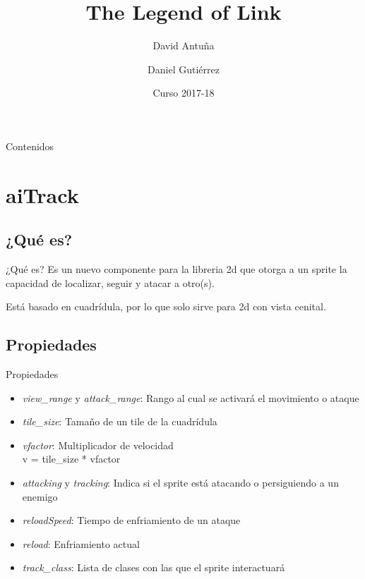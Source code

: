 \documentclass{beamer}
\title{The Legend of Link}
\author{David Antuña \and Daniel Gutiérrez}
\institute[UCM]
{
  DVI\\
  Universidad Complutense de Madrid
}
\date{Curso 2017-18}
\begin{document}
\begin{frame}
  \titlepage
\end{frame}

\begin{frame}{Contenidos}
  \tableofcontents
\end{frame}

\section{aiTrack}

\subsection{¿Qué es?}

\begin{frame}{¿Qué es?}
Es un nuevo componente para la libreria 2d que otorga a un sprite la capacidad
de localizar, seguir y atacar a otro(s).

\medskip

Está basado en cuadrídula, por lo que solo sirve para 2d con vista cenital.
\end{frame}

\subsection{Propiedades}

\begin{frame}{Propiedades}
\begin{itemize}
  \item \textit{view\_range} y \textit{attack\_range}: Rango al cual se activará
    el movimiento o ataque
  \item \textit{tile\_size}: Tamaño de un tile de la cuadrídula
  \item \textit{vfactor}: Multiplicador de velocidad\\
    v = tile\_size * vfactor
  \item \textit{attacking} y \textit{tracking}: Indica si el sprite está
    atacando o persiguiendo a un enemigo
  \item \textit{reloadSpeed}: Tiempo de enfriamiento de un ataque
  \item \textit{reload}: Enfriamiento actual
  \item \textit{track\_class}: Lista de clases con las que el sprite interactuará
\end{itemize}
\end{frame}
\end{document}
